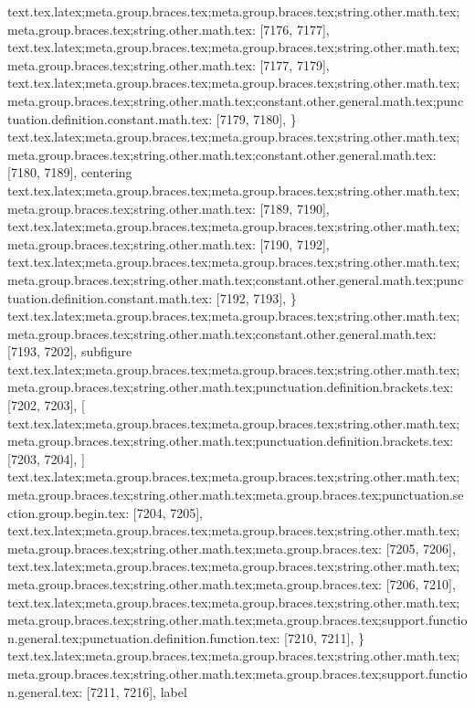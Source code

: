 {{{{{{{{{{{{{{{{{{{{{{{{{{{{{{{{{{{{{{{{{{{{{{{{{{{{{{{{{{{{{{{{{{{{{{{{{{{{{{{{{{{{{{{{{{{{{{{{{{{{{{{{{{{{{{{{{{{{{{{{{{{{{{{{{{{{{{{{{{{{{{{{{{{{{{{{{{{{{{{{{{{{{{{{{{{{{{{{{{{{{{{{{{{text.tex.latex;meta.group.braces.tex;meta.group.braces.tex;string.other.math.tex;meta.group.braces.tex;string.other.math.tex: [7176, 7177], {
}
text.tex.latex;meta.group.braces.tex;meta.group.braces.tex;string.other.math.tex;meta.group.braces.tex;string.other.math.tex: [7177, 7179], {  }
text.tex.latex;meta.group.braces.tex;meta.group.braces.tex;string.other.math.tex;meta.group.braces.tex;string.other.math.tex;constant.other.general.math.tex;punctuation.definition.constant.math.tex: [7179, 7180], {\}
text.tex.latex;meta.group.braces.tex;meta.group.braces.tex;string.other.math.tex;meta.group.braces.tex;string.other.math.tex;constant.other.general.math.tex: [7180, 7189], {centering}
text.tex.latex;meta.group.braces.tex;meta.group.braces.tex;string.other.math.tex;meta.group.braces.tex;string.other.math.tex: [7189, 7190], {
}
text.tex.latex;meta.group.braces.tex;meta.group.braces.tex;string.other.math.tex;meta.group.braces.tex;string.other.math.tex: [7190, 7192], {  }
text.tex.latex;meta.group.braces.tex;meta.group.braces.tex;string.other.math.tex;meta.group.braces.tex;string.other.math.tex;constant.other.general.math.tex;punctuation.definition.constant.math.tex: [7192, 7193], {\}
text.tex.latex;meta.group.braces.tex;meta.group.braces.tex;string.other.math.tex;meta.group.braces.tex;string.other.math.tex;constant.other.general.math.tex: [7193, 7202], {subfigure}
text.tex.latex;meta.group.braces.tex;meta.group.braces.tex;string.other.math.tex;meta.group.braces.tex;string.other.math.tex;punctuation.definition.brackets.tex: [7202, 7203], {[}
text.tex.latex;meta.group.braces.tex;meta.group.braces.tex;string.other.math.tex;meta.group.braces.tex;string.other.math.tex;punctuation.definition.brackets.tex: [7203, 7204], {]}
text.tex.latex;meta.group.braces.tex;meta.group.braces.tex;string.other.math.tex;meta.group.braces.tex;string.other.math.tex;meta.group.braces.tex;punctuation.section.group.begin.tex: [7204, 7205], {{}
text.tex.latex;meta.group.braces.tex;meta.group.braces.tex;string.other.math.tex;meta.group.braces.tex;string.other.math.tex;meta.group.braces.tex: [7205, 7206], {
}
text.tex.latex;meta.group.braces.tex;meta.group.braces.tex;string.other.math.tex;meta.group.braces.tex;string.other.math.tex;meta.group.braces.tex: [7206, 7210], {    }
text.tex.latex;meta.group.braces.tex;meta.group.braces.tex;string.other.math.tex;meta.group.braces.tex;string.other.math.tex;meta.group.braces.tex;support.function.general.tex;punctuation.definition.function.tex: [7210, 7211], {\}
text.tex.latex;meta.group.braces.tex;meta.group.braces.tex;string.other.math.tex;meta.group.braces.tex;string.other.math.tex;meta.group.braces.tex;support.function.general.tex: [7211, 7216], {label}
}}}}}}}}}}}}}}}}}}}}}}}}}}}}}}}}}}}}}}}}}}}}}}}}}}}}}}}}}}}}}}}}}}}}}}}}}}}}}}}}}}}}}}}}}}}}}}}}}}}}}}}}}}}}}}}}}}}}}}}}}}}}}}}}}}}}}}}}}}}}}}}}}}}}}}}}}}}}}}}}}}}}}}}}}}}}}}}}}}}}}}}}}}}}}}}
